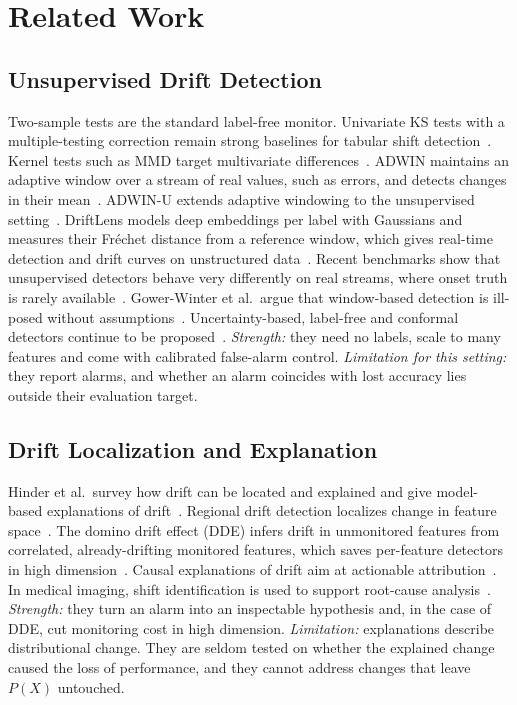 \section{Related Work}
\label{sec:related}

\subsection{Unsupervised Drift Detection}
Two-sample tests are the standard label-free monitor. Univariate KS tests with a
multiple-testing correction remain strong baselines for tabular shift
detection~\cite{rabanser2019failing}. Kernel tests such as MMD target multivariate
differences~\cite{gretton2012kernel}. ADWIN maintains an adaptive window over a
stream of real values, such as errors, and detects changes in their mean~\cite{bifet2007adwin}.
ADWIN-U extends adaptive windowing to the unsupervised setting~\cite{assis2025adwinu}.
DriftLens models deep embeddings per label with Gaussians and measures their Fréchet
distance from a reference window, which gives real-time detection and drift curves on
unstructured data~\cite{greco2025driftlens,greco2024driftlensdemo}. Recent benchmarks
show that unsupervised detectors behave very differently on real streams, where onset
truth is rarely available~\cite{lukats2025benchmark,souza2020challenges,cerqueira2026framework}.
Gower-Winter et al.\ argue that window-based detection is ill-posed without
assumptions~\cite{gowerwinter2026window}. Uncertainty-based, label-free and conformal detectors continue to be
proposed~\cite{lu2025pudd,tan2025flexible,eliades2025conformal}.
\emph{Strength:} they need no labels, scale to many features and come with
calibrated false-alarm control. \emph{Limitation for this setting:} they report
alarms, and whether an alarm coincides with lost accuracy lies outside their
evaluation target.

\subsection{Drift Localization and Explanation}
Hinder et al.\ survey how drift can be located and explained and give model-based
explanations of drift~\cite{hinder2024surveyA,hinder2024surveyB,hinder2023modelbased}.
Regional drift detection localizes change in feature space~\cite{liu2017regional}.
The domino drift effect (DDE) infers drift in unmonitored features from correlated,
already-drifting monitored features, which saves per-feature detectors in high
dimension~\cite{szucs2025dde}. Causal explanations of drift aim at actionable
attribution~\cite{komnick2026causal}. In medical imaging, shift identification is used
to support root-cause analysis~\cite{roschewitz2026shiftid}.
\emph{Strength:} they turn an alarm into an inspectable hypothesis and, in the case of
DDE, cut monitoring cost in high dimension. \emph{Limitation:} explanations describe
distributional change. They are seldom tested on whether the explained change caused
the loss of performance, and they cannot address changes that leave $P(X)$ untouched.

